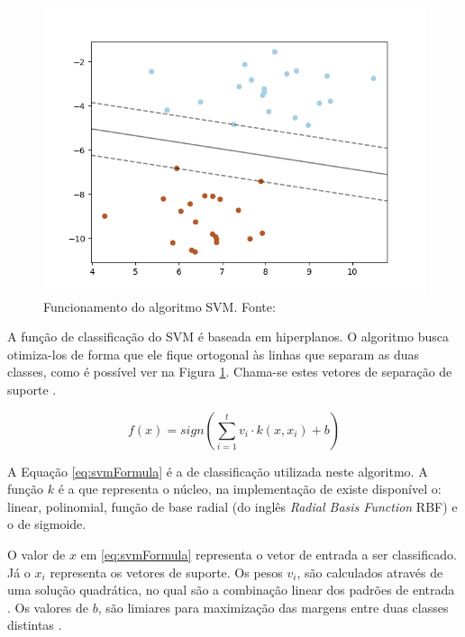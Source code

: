 \begin{figure}[ht]
	\centering
    \includegraphics[keepaspectratio=true,scale=0.7]{figuras/svmExample}
	\caption[SVM Funcionamento]{Funcionamento do algoritmo SVM. Fonte: }
	\label{fig:svmExample}
\end{figure}

A função de classificação do SVM é baseada em hiperplanos. O algoritmo busca otimiza-los de forma que ele fique ortogonal às linhas que separam as duas classes, como é possível ver na Figura \ref{fig:svmExample}. Chama-se estes vetores de separação de suporte \cite{smola_tutorial_2004}.

\begin{equation} \label{eq:svmFormula}
	f(x) = sign(\sum_{i=1}^{t} v_i \cdot k(x, x_i) + b)
\end{equation}

A Equação \ref{eq:svmFormula} é a de classificação utilizada neste algoritmo. A função $k$ é a que representa o núcleo, na implementação de  existe disponível o: linear, polinomial, função de base radial (do inglês \textit{Radial Basis Function} RBF) e o de sigmoide.

O valor de $x$ em \ref{eq:svmFormula} representa o vetor de entrada a ser classificado. Já o $x_{i}$ representa os vetores de suporte. Os pesos $v_{i}$, são calculados através de uma solução quadrática, no qual são a combinação linear dos padrões de entrada \cite{smola_tutorial_2004}. Os valores de $b$, são limiares para maximização das margens entre duas classes distintas \cite{hearst_support_1998}.


